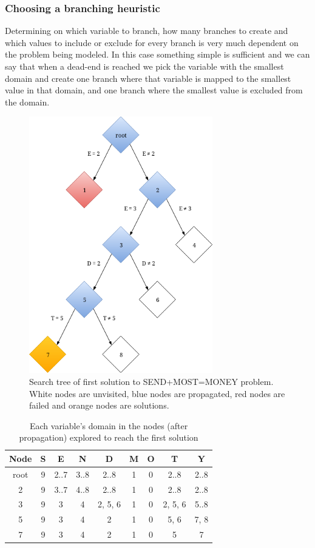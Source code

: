 \subsubsection{Choosing a branching heuristic}

Determining on which variable to branch, how many branches to create and which values to
include or exclude for every branch is very much dependent on the problem being modeled.
In this case something simple is sufficient and we can say that when a dead-end is reached
we pick the variable with the smallest domain and create one branch where that variable
is mapped to the smallest value in that domain, and one branch where the smallest value
is excluded from the domain.

\begin{figure}[h]
	\centering
	\includegraphics[width=8cm]{background/figures/constraint_first_solution}
	\caption{Search tree of first solution to SEND+MOST=MONEY problem.
	White nodes are unvisited, blue nodes are propagated, red nodes are failed and orange nodes are solutions.}
	\label{fig:first_solution}
\end{figure}

\begin{table}
	\centering
	\begin{tabular}{c|c|c|c|c|c|c|c|c}
		Node & S & E & N & D & M & O & T & Y \\
		\hline
		root & 9 & {2..7} & {3..8} & {2..8} & 1 & 0 & {2..8} & {2..8} \\
		2 & 9 & {3..7} & {4..8} & {2..8} & 1 & 0 & {2..8} & {2..8} \\
		3 & 9 & 3 & 4 & {2, 5, 6} & 1 & 0 & {2, 5, 6} & {5..8} \\
		5 & 9 & 3 & 4 & 2 & 1 & 0 & {5, 6} & {7, 8} \\
		7 & 9 & 3 & 4 & 2 & 1 & 0 & 5 & 7 \\
	\end{tabular}
	\caption{Each variable's domain in the nodes (after propagation) explored to reach the first solution}
	\label{tab:first_solution_states}
\end{table}

